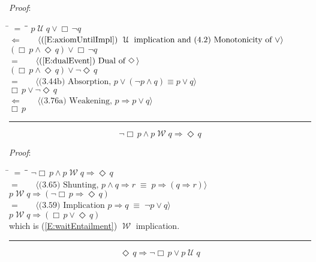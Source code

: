 \documentclass[12pt, fleqn, leqno]{article}
\newcommand{\lgap}{2pt}                             %
\newcommand{\mymathindent}{24pt}                    %
\newcommand{\equivs}{\ensuremath{\;\equiv\;}}       %
\newcommand{\impl}{\ensuremath{\Rightarrow}}        %
\newcommand{\foll}{\ensuremath{\Leftarrow}}         %
\newcommand{\Until}{\;\mathcal{U}\;}
\newcommand{\Wait}{\;\mathcal{W}\;}
\newcommand{\Event}{\Diamond\,}
\newcommand{\Always}{\Box\,}
\newcommand{\myqed}{\rule[-.23ex]{1.2ex}{2.0ex}}
\newcommand{\myqedtab}{\hspace{384pt}}              %
\newcommand{\Gll} {\langle}                         %
\newcommand{\Ggg} {\rangle}                         %
\newcommand{\Hint}[1]     {\ \ \ $\Gll              \mbox{#1} \Ggg$ }   %
\begin{document}
\emph{Proof}:
\begin{tabbing}
\hspace{\mymathindent} \= $= \;$ \= \myqedtab \= \kill
\> \> $p \Until q \lor \Always\neg q$\\[\lgap]
\> $\foll$ \> \Hint{(\ref{E:axiomUntilImpl}) $\Until$ implication and (4.2) Monotonicity of $\lor$} \\[\lgap]
\> \> $(\Always p \land \Event q) \lor \Always\neg q$\\[\lgap]
\> $=$  \>  \Hint{(\ref{E:dualEvent}) Dual of $\Event$}\\[\lgap]
\> \> $(\Always p \land \Event q) \lor \neg \Event q$\\[\lgap]
\> $=$  \>  \Hint{(3.44b) Absorption, $p \lor (\neg p \land q) \equiv p \lor q$}\\[\lgap]
\> \> $\Always p \lor \neg \Event q$\\[\lgap]
\> $\foll$ \> \Hint{(3.76a) Weakening, $p\impl p\lor q$} \\[\lgap]
\> \> $\Always p$ \quad \myqed
\end{tabbing}
\begin{equation}\label{E:waitEntailEvent}
\neg\Always p\land p \Wait q \impl \Event q
\end{equation}

\emph{Proof}:
\begin{tabbing}
\hspace{\mymathindent} \= $= \;$ \= \myqedtab \= \kill
\> \> $\neg\Always p\land p \Wait q \impl \Event q$\\[\lgap]
\> $=$  \>  \Hint{(3.65) Shunting, $p\land q \impl r \equivs p \impl (q \impl r)$}\\[\lgap]
\> \> $p\Wait q \impl (\neg\Always p\impl \Event q)$\\[\lgap]
\> $=$  \>  \Hint{(3.59) Implication $p\impl q \equivs \neg p \lor q$}\\[\lgap]
\> \> $p\Wait q \impl (\Always p\lor \Event q)$\\[\lgap]
\> which is (\ref{E:waitEntailment}) $\Wait$ implication. \quad \myqed
\end{tabbing}
\begin{equation}\label{E:untilEntailEvent}
\Event q\impl \neg\Always p\lor p \Until q
\end{equation}
\end{document}
